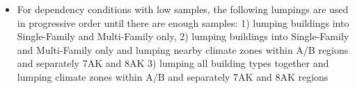 \begin{itemize}
\item For dependency conditions with low samples, the following lumpings are used in progressive order until there are enough samples: 1) lumping buildings into Single-Family and Multi-Family only,  2) lumping buildings into Single-Family and Multi-Family only and lumping nearby climate zones within  A/B regions and separately 7AK and 8AK 3) lumping all building types together and lumping climate zones within A/B and separately 7AK and 8AK regions
\end{itemize}
